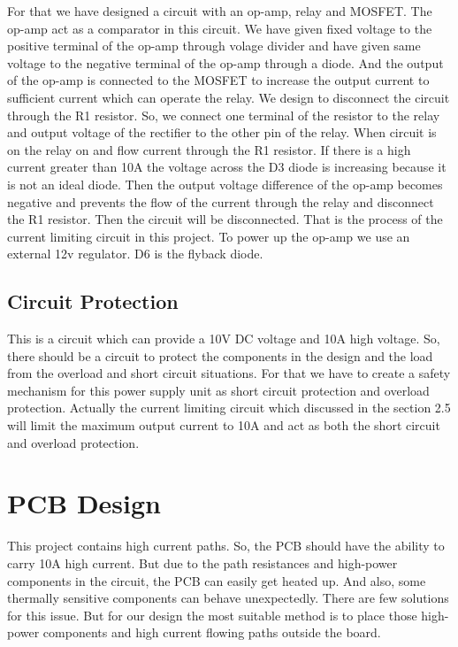 \documentclass[11pt,a4paper]{article}
\begin{document}
\begin{multicols}{2}
For that we have designed a circuit with an op-amp, relay and MOSFET. The op-amp act as a comparator in this circuit. We have given fixed voltage to the positive terminal of the op-amp through volage divider and have given same voltage to the negative terminal of the op-amp through a diode. And the output of the op-amp is connected to the MOSFET to increase the output current to sufficient current which can operate the relay. We design to disconnect the circuit through the R1 resistor. So, we connect one terminal of the resistor to the relay and output voltage of the rectifier to the other pin of the relay. When circuit is on the relay on and flow current through the R1 resistor. If there is a high current greater than 10A the voltage across the D3 diode is increasing because it is not an ideal diode. Then the output voltage difference of the op-amp becomes negative and prevents the flow of the current through the relay and disconnect the R1 resistor. Then the circuit will be disconnected. That is the process of the current limiting circuit in this project. To power up the op-amp we use an external 12v regulator. D6 is the flyback diode.

\vspace{0.2in}
\subsection{Circuit Protection}
This is a circuit which can provide a 10V DC voltage and 10A high voltage. So, there should be a circuit to protect the components in the design and the load from the overload and short circuit situations. For that we have to create a safety mechanism for this power supply unit as short circuit protection and overload protection. Actually the current limiting circuit which discussed in the section 2.5 will limit the maximum output current to 10A and act as both the short circuit and overload protection.

\section{PCB Design }
This project contains high current paths. So, the PCB should have the ability to carry 10A high current. But due to the path resistances and high-power components in the circuit, the PCB can easily get heated up. And also, some thermally sensitive components can behave unexpectedly. There are few solutions for this issue. But for our design the most suitable method is to place those high-power components and high current flowing paths outside the board.


\end{multicols}
\end{document}
